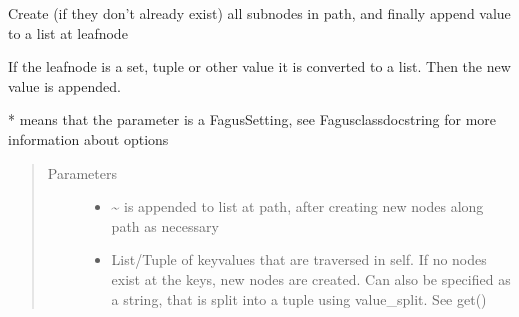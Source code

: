 \documentclass[a4paper,10pt,english]{sphinxmanual}
\begin{document}
\begin{fulllineitems}
\begin{fulllineitems}
\label{\detokenize{fagus.fagus:fagus.fagus.Fagus.append}}
\pysigstartsignatures
{}
\pysigstopsignatures
\sphinxAtStartPar
Create (if they don’t already exist) all sub\sphinxhyphen{}nodes in path, and finally append value to a list at leaf\sphinxhyphen{}node

\sphinxAtStartPar
If the leaf\sphinxhyphen{}node is a set, tuple or other value it is converted to a list. Then the new value is appended.

\sphinxAtStartPar
* means that the parameter is a Fagus\sphinxhyphen{}Setting, see Fagus\sphinxhyphen{}class\sphinxhyphen{}docstring for more information about options
\begin{quote}\begin{description}
\item[{Parameters}] \leavevmode\begin{itemize}
\item {}
\sphinxAtStartPar
{} \textendash{} \textasciitilde{} is appended to list at path, after creating new nodes along path as necessary

\item {}
\sphinxAtStartPar
{} \textendash{} List/Tuple of key\sphinxhyphen{}values that are traversed in self. If no nodes exist at the keys, new nodes are
created. Can also be specified as a string, that is split into a tuple using value\_split. See get()


\end{itemize}
\end{description}
\end{quote}
\end{fulllineitems}
\end{fulllineitems}
\end{document}
